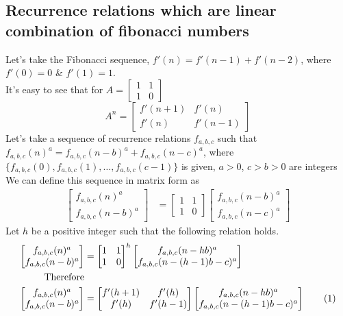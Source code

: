 \documentclass[preprint,12pt]{elsarticle}
\begin{document}
\subsection{Recurrence relations which are linear combination of fibonacci numbers}
\label{recurr}
Let's take the Fibonacci sequence, $f'(n) = f'(n - 1) + f'(n - 2)$, where $f'(0) = 0$ \& $f'(1) = 1$.\\
It's easy to see that for $A  = \begin{bmatrix}1 & 1 \\ 1 & 0 \end{bmatrix}$ $$A^n = \begin{bmatrix}f'(n + 1) & f'(n) \\ f'(n) & f'(n - 1)\end{bmatrix}$$
Let's take a sequence of recurrence relations $f_{a,b,c}$ such that\\ $f_{a,b,c}(n)^a = f_{a,b,c}(n - b)^a+f_{a,b,c}(n - c)^a$, where $\{f_{a,b,c}(0), f_{a,b,c}(1), \ldots, f_{a,b,c}(c - 1)\}$ is given, $a > 0$, $c > b > 0$ are integers \\
We can define this sequence in matrix form as
\begin{align*}
\begin{bmatrix}f_{a,b,c}(n)^a \\f_{a,b,c}(n - b)^a\end{bmatrix} 
&=
\begin{bmatrix}1 & 1\\1 & 0\end{bmatrix}
\begin{bmatrix}f_{a,b,c}(n - b)^a\\f_{a,b,c}(n - c)^a\end{bmatrix}
\end{align*}
Let $h$ be a positive integer such that the following relation holds.
\begin{align*}
\begin{bmatrix}f_{a,b,c}(n)^a \\f_{a,b,c}(n - b)^a\end{bmatrix}
&=
\begin{bmatrix}1 & 1\\1 & 0\end{bmatrix}^h
\begin{bmatrix}f_{a,b,c}(n - hb)^a\\f_{a,b,c}(n-(h-1)b - c)^a\end{bmatrix}\\
\text{Therefore}\\
\begin{bmatrix}f_{a,b,c}(n)^a \\f_{a,b,c}(n - b)^a\end{bmatrix}
&=
\begin{bmatrix}f'(h+1) & f'(h)\\f'(h) & f'(h-1)\end{bmatrix}
\begin{bmatrix}f_{a,b,c}(n - hb)^a\\f_{a,b,c}(n-(h-1)b - c)^a\end{bmatrix}
\stepcounter{equation}\tag{\theequation}\label{myeq1}\\
\end{align*}
\end{document}
